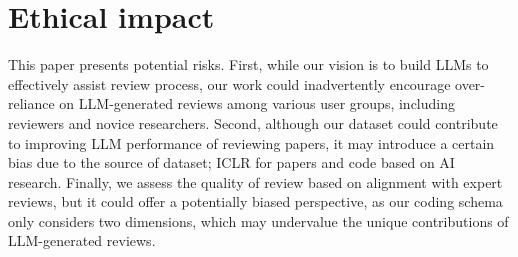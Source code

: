 \section*{Ethical impact}
This paper presents potential risks. First, while our vision is to build LLMs to effectively assist review process, our work could inadvertently encourage over-reliance on LLM-generated reviews among various user groups, including reviewers and novice researchers. Second, although our dataset could contribute to improving LLM performance of reviewing papers, it may introduce a certain bias due to the source of dataset; ICLR for papers and code based on AI research. Finally, we assess the quality of review based on alignment with expert reviews, but it could offer a potentially biased perspective, as our coding schema only considers two dimensions, which may undervalue the unique contributions of LLM-generated reviews.